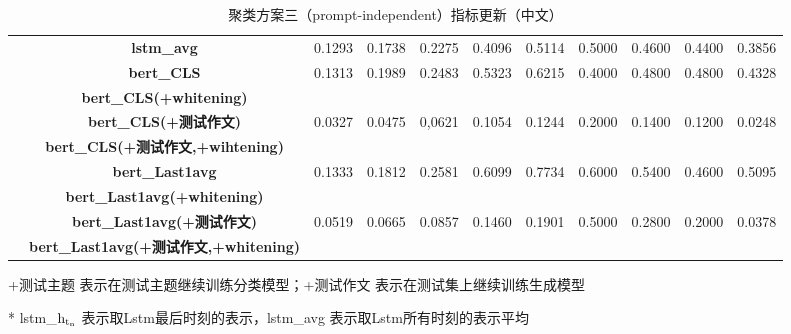 \documentclass[11pt]{article}
\begin{document}
\begin{CJK}{UTF8}{gkai}
\begin{table}[htbp]
{\begin{tabular}{c|c|ccccccccc}
      & \textbf{lstm\_avg} & 0.1293  & 0.1738  & 0.2275  & 0.4096  & 0.5114  & 0.5000  & 0.4600  & 0.4400  & 0.3856  \\
      \cline{2-11}
      & \textbf{bert\_CLS} & 0.1313  & 0.1989  & 0.2483  & 0.5323  & 0.6215  & 0.4000  & 0.4800  & 0.4800  & 0.4328  \\
      & \textbf{bert\_CLS(+whitening)} &       &       &       &       &       &       &       &       &  \\
      & \textbf{bert\_CLS(+测试作文)} & 0.0327  & 0.0475  & 0,0621 & 0.1054  & 0.1244  & 0.2000  & 0.1400  & 0.1200  & 0.0248  \\
      & \textbf{bert\_CLS(+测试作文,+wihtening)} &       &       &       &       &       &       &       &       &  \\
      \cline{2-11}
      & \textbf{bert\_Last1avg} & 0.1333  & 0.1812  & 0.2581  & 0.6099  & 0.7734  & 0.6000  & 0.5400  & 0.4600  & 0.5095  \\
      & \textbf{bert\_Last1avg(+whitening)} &       &       &       &       &       &       &       &       &  \\
      & \textbf{bert\_Last1avg(+测试作文)} & 0.0519  & 0.0665  & 0.0857  & 0.1460  & 0.1901  & 0.5000  & 0.2800  & 0.2000  & 0.0378  \\
      & \textbf{bert\_Last1avg(+测试作文,+whitening)} &       &       &       &       &       &       &       &       &  \\
      \hline
    \end{tabular}}%
    \begin{tablenotes}    %
      \footnotesize               %
      \item[2] +测试主题 表示在测试主题继续训练分类模型；+测试作文 表示在测试集上继续训练生成模型
      \item[5] * lstm\_$\rm h_{t_n}$ 表示取Lstm最后时刻的表示，lstm\_avg 表示取Lstm所有时刻的表示平均 
    \end{tablenotes} 
    \caption{聚类方案三（prompt-independent）指标更新（中文）}
  \label{tab:addlabel}%
\end{table}%


\end{CJK}
\end{document}
